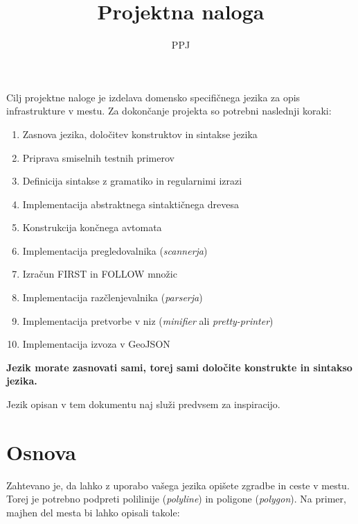 \documentclass{article}
\title{Projektna naloga}
\author{PPJ}
\begin{document}
\maketitle

Cilj projektne naloge je izdelava domensko specifičnega jezika za opis infrastrukture v mestu.
Za dokončanje projekta so potrebni naslednji koraki:

\begin{enumerate}
\item Zasnova jezika, določitev konstruktov in sintakse jezika
\item Priprava smiselnih testnih primerov
\item Definicija sintakse z gramatiko in regularnimi izrazi
\item Implementacija abstraktnega sintaktičnega drevesa
\item Konstrukcija končnega avtomata
\item Implementacija pregledovalnika (\emph{scannerja})
\item Izračun \textsc{FIRST} in \textsc{FOLLOW} množic
\item Implementacija razčlenjevalnika (\emph{parserja})
\item Implementacija pretvorbe v niz (\emph{minifier} ali \emph{pretty-printer})
\item Implementacija izvoza v GeoJSON
\end{enumerate}

\textbf{Jezik morate zasnovati sami, torej sami določite konstrukte in sintakso jezika.}

Jezik opisan v tem dokumentu naj služi predvsem za inspiracijo.

\newpage
\section{Osnova}
Zahtevano je, da lahko z uporabo vašega jezika opišete zgradbe in ceste v mestu.
Torej je potrebno podpreti polilinije (\emph{polyline}) in poligone (\emph{polygon}).
Na primer, majhen del mesta bi lahko opisali takole:
\end{document}

